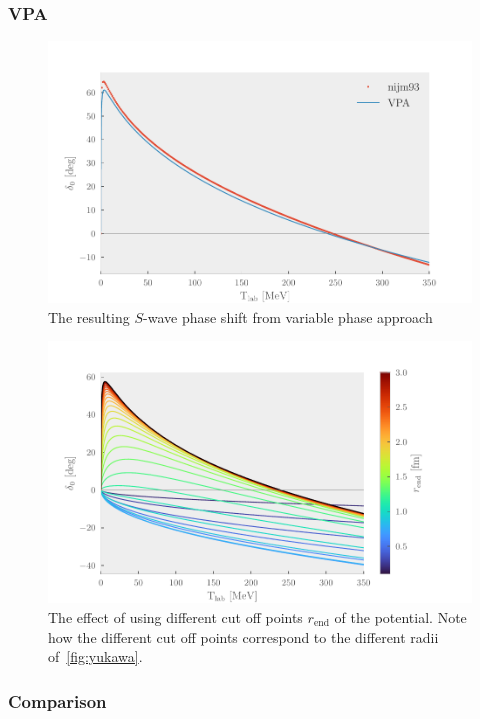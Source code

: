 \subsubsection{VPA}

\begin{figure}[ht]
  \centering
  \includegraphics[]{Figures/vpa.pdf}
  \caption{\label{fig:vpa} The resulting \(S\)-wave phase shift from variable
    phase approach}
\end{figure}

\begin{figure}[ht]
  \centering
  \includegraphics[]{Figures/rend.pdf}
  \caption{\label{fig:rend} The effect of using different cut off points
    \(r_{\mathrm{end}}\) of the potential. Note how the different cut off points
    correspond to the different radii of~\cref{fig:yukawa}.}
\end{figure}



\subsubsection{Comparison}


